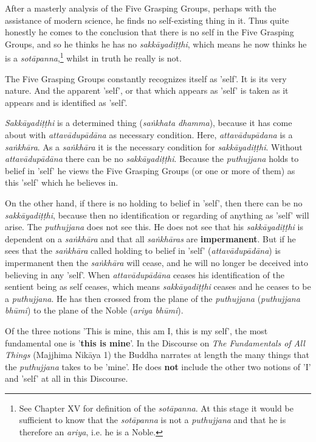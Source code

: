 After a masterly analysis of the Five Grasping Groups, perhaps with the assistance of modern science, he finds no self-existing thing in it. Thus quite honestly he comes to the conclusion that there is no self in the Five Grasping Groups, and so he thinks he has no \emph{sakkāyadiṭṭhi}, which means he now thinks he is a \emph{sotāpanna},\footnote{See Chapter XV for definition of the \emph{sotāpanna}. At this stage it would be sufficient to know that the \emph{sotāpanna} is not a \emph{puthujjana} and that he is therefore an \emph{ariya}, i.e. he is a Noble.} whilst in truth he really is not.

The Five Grasping Groups constantly recognizes itself as 'self'. It is its very nature. And the apparent 'self', or that which appears as 'self' is taken as it appears and is identified as 'self'.

\emph{Sakkāyadiṭṭhi} is a determined thing (\emph{saṅkhata dhamma}), because it has come about with \emph{attavādupādāna} as necessary condition. Here, \emph{attavādupādana} is a \emph{saṅkhāra}. As a \emph{saṅkhāra} it is the necessary condition for \emph{sakkāyadiṭṭhi}. Without \emph{attavādupādāna} there can be no \emph{sakkāyadiṭṭhi}. Because the \emph{puthujjana} holds to belief in 'self' he views the Five Grasping Groups (or one or more of them) as this 'self' which he believes in.

On the other hand, if there is no holding to belief in 'self', then there can be no \emph{sakkāyadiṭṭhi}, because then no identification or regarding of anything as 'self' will arise. The \emph{puthujjana} does not see this. He does not see that his \emph{sakkāyadiṭṭhi} is dependent on a \emph{saṅkhāra} and that all \emph{saṅkhāras} are \textbf{impermanent}. But if he sees that the \emph{saṅkhāra} called holding to belief in 'self' (\emph{attavādupādāna}) is impermanent then the \emph{saṅkhāra} will cease, and he will no longer be deceived into believing in any 'self'. When \emph{attavādupādāna} ceases his identification of the sentient being as self ceases, which means \emph{sakkāyadiṭṭhi} ceases and he ceases to be a \emph{puthujjana}. He has then crossed from the plane of the \emph{puthujjana} (\emph{puthujjana bhūmi}) to the plane of the Noble (\emph{ariya bhūmi}).

Of the three notions 'This is mine, this am I, this is my self', the most fundamental one is '\textbf{this is mine}'. In the Discourse on \emph{The Fundamentals of All Things} (Majjhima Nikāya 1) the Buddha narrates at length the many things that the \emph{puthujjana} takes to be 'mine'. He does \textbf{not} include the other two notions of 'I' and 'self' at all in this Discourse.

